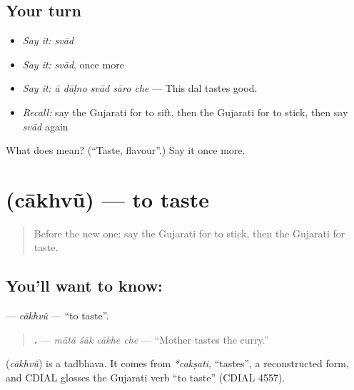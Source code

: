 \subsection*{Your turn}
\begin{itemize}
\raggedright
  \item \emph{Say it:} \emph{svād}
  \item \emph{Say it:} \emph{svād}, once more
  \item \emph{Say it:} \emph{ā dāḷno svād sāro che} — This dal tastes good.
  \item \emph{Recall:} say the Gujarati for to sift, then the Gujarati for to stick, then say \emph{svād} again
\end{itemize}

\begin{tcolorbox}[breakable,colback=teal!4,colframe=teal!35!black,title={Before you move on}]
What does  mean? (\textquotedblleft{}Taste, flavour\textquotedblright{}.) Say it once more.
\end{tcolorbox}
\section[\texorpdfstring{\gu{ચાખવું} (cākhvũ)}{ચાખવું (cākhvũ)}]{ (cākhvũ) — to taste}

\label{lesson:GU-C171-cakhvu}



\begin{quote}
Before the new one: say the Gujarati for to stick, then the Gujarati for taste.
\end{quote}

\subsection*{You'll want to know: }
\textbf{} — \emph{cākhvũ} — \textquotedblleft{}to taste\textquotedblright{}.

\begin{quote}
\textbf{   .} — \emph{mātā śāk cākhe che} — \textquotedblleft{}Mother tastes the curry.\textquotedblright{}
\end{quote}

\begin{cousinweb}
\textbf{} (\emph{cākhvũ}) is a tadbhava. It comes from \emph{*cakṣati}, \textquotedblleft{}tastes\textquotedblright{}, a reconstructed form, and CDIAL glosses the Gujarati verb \textquotedblleft{}to taste\textquotedblright{} (CDIAL 4557).
\end{cousinweb}

